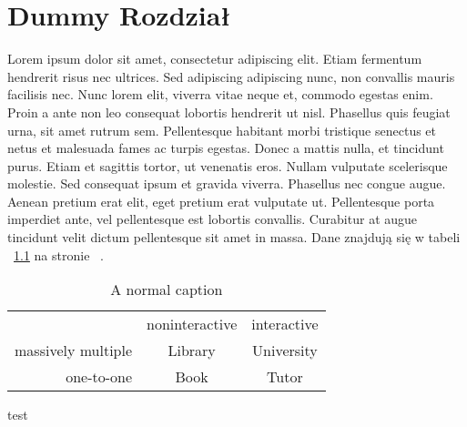\chapter{Dummy Rozdział}
Lorem ipsum dolor sit amet, consectetur adipiscing elit. Etiam fermentum hendrerit risus nec ultrices. Sed adipiscing adipiscing nunc, non convallis mauris facilisis nec. Nunc lorem elit, viverra vitae neque et, commodo egestas enim. Proin a ante non leo consequat lobortis hendrerit ut nisl. Phasellus quis feugiat urna, sit amet rutrum sem. Pellentesque habitant morbi tristique senectus et netus et malesuada fames ac turpis egestas. Donec a mattis nulla, et tincidunt purus. Etiam et sagittis tortor, ut venenatis eros. Nullam vulputate scelerisque molestie. Sed consequat ipsum et gravida viverra. Phasellus nec congue augue. Aenean pretium erat elit, eget pretium erat vulputate ut. Pellentesque porta imperdiet ante, vel pellentesque est lobortis convallis. Curabitur at augue tincidunt velit dictum pellentesque sit amet in massa. Dane znajdują się w tabeli ~\ref{tabela:testowa} na stronie ~\pageref{tabela:testowa}.
\begin{table}[h] %
	\caption{A normal caption}
	\begin{tabular}{ r|c|c| }
		\multicolumn{1}{r}{}
 		&  \multicolumn{1}{c}{noninteractive}
 		& \multicolumn{1}{c}{interactive} \\
		\cline{2-3}
		massively multiple & Library & University \\
		\cline{2-3}
		one-to-one & Book & Tutor \\
		\cline{2-3}
	\end{tabular}
	\label{tabela:testowa}
\end{table}
test \cite{abramowitz+stegun}